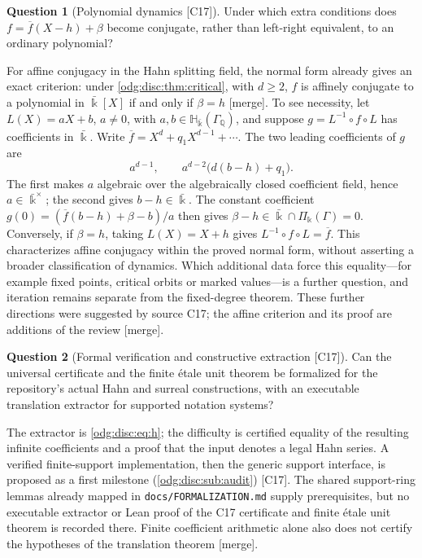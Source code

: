 \documentclass[11pt,oneside]{article}
\numberwithin{equation}{section}
\theoremstyle{definition}
\newtheorem{question}[question]{Question}
\theoremstyle{remark}
\newcommand{\Q}{\mathbb Q}
\newcommand{\src}[1]{\textup{\textsf{\small[#1]}}}
\newcommand{\mergetag}{\textup{\textsf{\small[merge]}}}
\newcommand{\fn}[1]{\nolinkurl{#1}}
\newcommand{\crP}{\Pi_\Bbbk(\Gamma)}
\newcommand{\Hbar}{\mathbb H_{\bar\Bbbk}(\Gamma_\Q)}
\begin{document}
\begin{question}[Polynomial dynamics \src{C17}]\label{odg:disc:q:dynamics}
Under which extra conditions does $f=\overline f(X-h)+\beta$ become conjugate, rather than
left-right equivalent, to an ordinary polynomial?
\end{question}
For affine conjugacy in the Hahn splitting field, the normal form already gives an exact
criterion: under \cref{odg:disc:thm:critical}, with $d\ge2$, $f$ is affinely conjugate
to a polynomial in $\bar\Bbbk[X]$ if and only if $\beta=h$ \mergetag.
To see necessity, let $L(X)=aX+b$, $a\ne0$, with $a,b\in\Hbar$, and suppose
$g=L^{-1}\circ f\circ L$ has coefficients in $\bar\Bbbk$. Write
$\overline f=X^d+q_1X^{d-1}+\cdots$. The two leading coefficients of $g$ are
\[
 a^{d-1},\qquad a^{d-2}\bigl(d(b-h)+q_1\bigr).
\]
The first makes $a$ algebraic over the algebraically closed coefficient field, hence
$a\in\bar\Bbbk^\times$; the second gives $b-h\in\bar\Bbbk$. The constant coefficient
$g(0)=(\overline f(b-h)+\beta-b)/a$ then gives
$\beta-h\in\bar\Bbbk\cap\crP=0$. Conversely, if $\beta=h$, taking $L(X)=X+h$
gives $L^{-1}\circ f\circ L=\overline f$. This characterizes affine conjugacy within
the proved normal form, without asserting a broader classification of dynamics.
Which additional data force this equality---for example fixed points, critical orbits
or marked values---is a further question, and iteration remains separate from the
fixed-degree theorem. These further directions were suggested by source C17; the affine
criterion and its proof are additions of the review \mergetag.

\begin{question}[Formal verification and constructive extraction \src{C17}]\label{odg:disc:q:lean}
Can the universal certificate and the finite \'etale unit theorem be formalized for the
repository's actual Hahn and surreal constructions, with an executable translation
extractor for supported notation systems?
\end{question}
The extractor is \eqref{odg:disc:eq:h}; the difficulty is certified equality of the
resulting infinite coefficients and a proof that the input denotes a legal Hahn series. A
verified finite-support implementation, then the generic support interface, is proposed as a
first milestone (\cref{odg:disc:sub:audit}) \src{C17}. The shared support-ring lemmas
already mapped in \fn{docs/FORMALIZATION.md} supply prerequisites, but no executable
extractor or Lean proof of the C17 certificate and finite \'etale unit theorem is recorded
there. Finite coefficient arithmetic alone also does not certify the hypotheses of the
translation theorem \mergetag.
\end{document}
